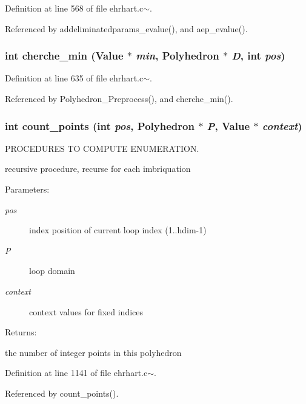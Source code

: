 Definition at line 568 of file ehrhart.c$\sim$.

Referenced by addeliminatedparams\_\-evalue(), and aep\_\-evalue().

\subsubsection{\setlength{\rightskip}{0pt plus 5cm}int cherche\_\-min (Value $\ast$ {\em min}, Polyhedron $\ast$ {\em D}, int {\em pos})}\label{ehrhart_8c~_a19}




Definition at line 635 of file ehrhart.c$\sim$.

Referenced by Polyhedron\_\-Preprocess(), and cherche\_\-min().

\subsubsection{\setlength{\rightskip}{0pt plus 5cm}int count\_\-points (int {\em pos}, Polyhedron $\ast$ {\em P}, Value $\ast$ {\em context})}\label{ehrhart_8c~_a23}


PROCEDURES TO COMPUTE ENUMERATION.

recursive procedure, recurse for each imbriquation\begin{Desc}
\item[Parameters: ]\par
\begin{description}
\item[{\em 
pos}]index position of current loop index (1..hdim-1) \item[{\em 
P}]loop domain \item[{\em 
context}]context values for fixed indices  \end{description}
\end{Desc}
\begin{Desc}
\item[Returns: ]\par
the number of integer points in this polyhedron \end{Desc}


Definition at line 1141 of file ehrhart.c$\sim$.

Referenced by count\_\-points().

